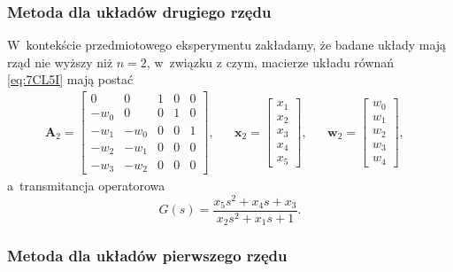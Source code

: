 \documentclass[paper=a4,DIV=12]{lpas}
\begin{document}
\begin{appendices}
  \subsubsection{Metoda dla układów drugiego rzędu}
  \label{eq:7RDBZ}

  W~kontekście przedmiotowego eksperymentu zakładamy, że badane układy mają
  rząd nie wyższy niż $n=2$, w~związku z czym, macierze układu równań
  \eqref{eq:7CL5I} mają postać
  \begin{equation}
    \begin{aligned}
      \mathbf{A}_2 = \begin{bmatrix}
         0    &    0 & 1 & 0 & 0 \\
         -w_0 &    0 & 0 & 1 & 0 \\
         -w_1 & -w_0 & 0 & 0 & 1 \\
         -w_2 & -w_1 & 0 & 0 & 0 \\
         -w_3 & -w_2 & 0 & 0 & 0
      \end{bmatrix}, &
      & \mathbf{x}_2 = \begin{bmatrix}
        x_1 \\ x_2 \\ x_3 \\ x_4 \\ x_5
      \end{bmatrix}, &
      & \mathbf{w}_2 = \begin{bmatrix}
        w_0 \\ w_1 \\  w_2 \\ w_3 \\ w_4
      \end{bmatrix}, &
    \end{aligned}
  \end{equation}
  a~transmitancja operatorowa
  \begin{equation}
    G(s) = \frac{x_5 s^2 + x_4 s + x_3}{x_2 s^2 + x_1 s + 1}.
  \end{equation}

  \subsubsection{Metoda dla układów pierwszego rzędu}
  \label{eq:R5YS1}


\end{appendices}
\end{document}
